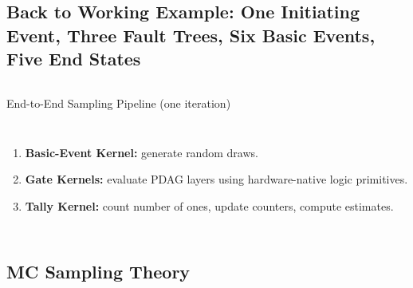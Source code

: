 \subsection{Back to Working Example: One Initiating Event, Three Fault Trees, Six Basic Events, Five End States}
\begin{frame}
  \begin{columns}
  \end{columns}  
\end{frame}

\begin{frame}{End-to-End Sampling Pipeline (one iteration)}
  \begin{columns}
  \tiny   
  \begin{enumerate}[<+->]
    \item \textbf{Basic-Event Kernel:} generate random draws.
    \item \textbf{Gate Kernels:} evaluate PDAG layers using hardware-native logic primitives.
    \item \textbf{Tally Kernel:} count number of ones, update counters, compute estimates.
  \end{enumerate}
  \end{columns}  
\end{frame}

\subsection{MC Sampling Theory}


